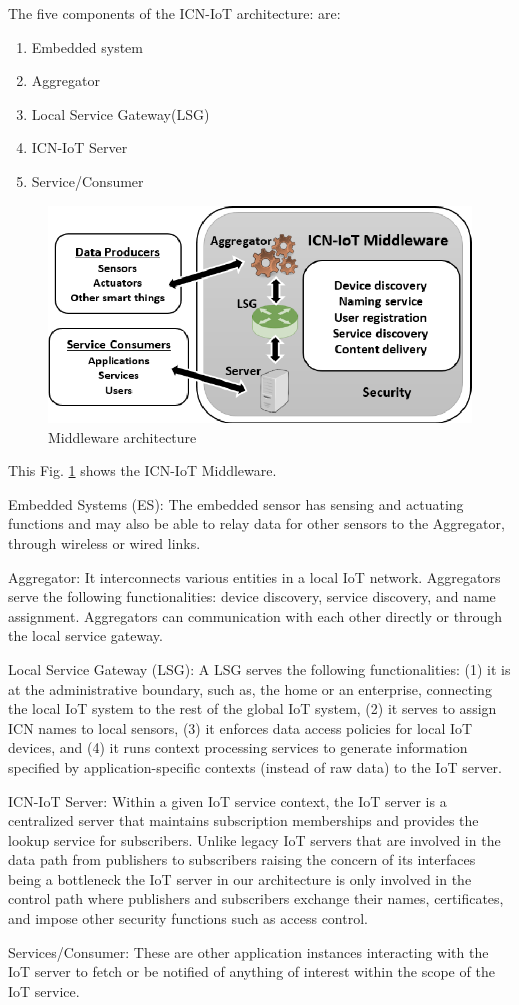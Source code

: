 The five components of the ICN-IoT architecture: are:
\begin{enumerate}
\item Embedded system
\item Aggregator
\item Local Service Gateway(LSG)
\item ICN-IoT Server
\item Service/Consumer
\end{enumerate}
\begin{figure}[ht]
	\centering
	\includegraphics[width=0.8\linewidth]{Figures/Architecture.png}
	\caption[]{Middleware architecture}
	\label{fig:architecture}
\end{figure}
This Fig. \ref{fig:architecture} shows the ICN-IoT Middleware.

Embedded Systems (ES): The embedded sensor has sensing and actuating functions and may also be able to relay data for other sensors to the Aggregator, through wireless or wired links.\par
Aggregator: It interconnects various entities in a local IoT network. Aggregators serve the following functionalities: device discovery, service discovery, and name assignment. Aggregators can communication with each other directly or through the local service gateway.\par
Local Service Gateway (LSG): A LSG serves the following functionalities: (1) it is at the administrative boundary, such as, the home or an enterprise, connecting the local IoT system to the rest of the global IoT system, (2) it serves to assign ICN names to local sensors, (3) it enforces data access policies for local IoT devices, and (4) it runs context processing services to generate information specified by application-specific contexts (instead of raw data) to the IoT server.\par
ICN-IoT Server: Within a given IoT service context, the IoT server is a centralized server that maintains subscription memberships and provides the lookup service for subscribers. Unlike legacy IoT servers that are involved in the data path from publishers to subscribers raising the concern of its interfaces being a bottleneck the IoT server in our architecture is only involved in the control path where publishers and subscribers exchange their names, certificates, and impose other security functions such as access control.\par
Services/Consumer: These are other application instances interacting with the IoT server to fetch or be notified of anything of interest within the scope of the IoT service.\par

